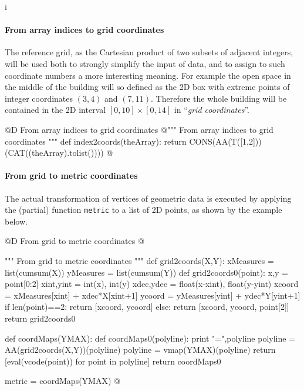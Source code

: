 i\documentclass[11pt,oneside]{article}    %
\begin{document}
\paragraph{From array indices to grid coordinates}

The reference grid, as the Cartesian product of two subsets of adjacent integers, will be used both to strongly simplify the input of data, and to assign to such coordinate numbers a more interesting meaning. For example the open space in the middle of the building will so defined as the 2D box with extreme points of integer coordinates $(3,4)$ and $(7,11)$.
Therefore the whole building  will be contained in the 2D interval $[0,10]\times [0,14]$ in ``\emph{grid coordinates}''.

@D From array indices to grid coordinates
@{""" From array indices to grid coordinates """
def index2coords(theArray):
    return CONS(AA(T([1,2]))(CAT((theArray).tolist())))
@}


\paragraph{From grid to metric coordinates}
The actual transformation of vertices of geometric data is executed by applying the (partial) function \texttt{metric} to a list of 2D points, as shown by the example below.

@D From grid to metric coordinates
@{""" From grid to metric coordinates """
def grid2coords(X,Y):
    xMeasures = list(cumsum(X))
    yMeasures = list(cumsum(Y))
    def grid2coords0(point):
        x,y = point[0:2]
        xint,yint = int(x), int(y)
        xdec,ydec = float(x-xint), float(y-yint)
        xcoord = xMeasures[xint] + xdec*X[xint+1]
        ycoord = yMeasures[yint] + ydec*Y[yint+1]
        if len(point)==2: return [xcoord, ycoord]
        else: return [xcoord, ycoord, point[2]]
    return grid2coords0

def coordMaps(YMAX):
    def coordMaps0(polyline):
        print "\npolyline =",polyline
        polyline = AA(grid2coords(X,Y))(polyline)
        polyline = vmap(YMAX)(polyline)
        return [eval(vcode(point)) for point in polyline]
    return coordMaps0

metric = coordMaps(YMAX)
@}
\end{document}
